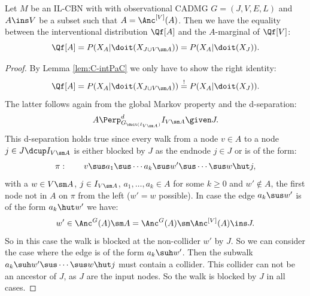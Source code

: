 \begin{Lem}
    \label{lem:int-anc}
    Let $M$ be an IL-CBN with with observational CADMG $G=(J,V,E,L)$ and $A \ins V$ be a subset such that 
    $A=\Anc^{[V]}(A)$.
    Then we have the equality between the interventional distribution $\Qf[A]$ and the $A$-marginal of $\Qf[V]$:
            \[ \Qf[A] = P(X_A|\doit(X_{J \cup V \sm A})) = P(X_A|\doit(X_J)). \]
    \begin{proof}
        By Lemma \ref{lem:C-intPaC} we only have to show the right identity:
        \[ \Qf[A] = P(X_A|\doit(X_{J \cup V \sm A})) \stackrel{!}{=} P(X_A|\doit(X_J)). \]
       The latter follows again from the global Markov property and the d-separation:
       \[ A \Perp^d_{G_{\doit(I_{V \sm A})}} I_{V \sm A} \given J.  \]
       This d-separation holds true since every walk from a node $v \in A$ to a node $j \in J \dcup I_{V \sm A}$ is either blocked by $J$ as the endnode $j \in J$ or is of the form:
       \[\pi:\qquad v \sus a_1 \sus \cdots a_k \sus w' \sus \cdots \sus w \hut j,\]
       with a $ w \in V \sm A$, $j \in I_{V\sm A}$, $a_1,\dots, a_k \in A$ for some $k \ge 0$ and $w' \notin A$, the first node not in $A$ on $\pi$ from the left ($w'=w$ possible).
       In case the edge $a_k \sus w'$ is of the form $a_k \hut w'$ we have:
       \[w' \in \Anc^G(A) \sm A = \Anc^G(A) \sm \Anc^{[V]}(A)  \ins J.\] 
      So in this case the walk is blocked at the non-collider $w'$ by $J$. 
       So we can consider the case where the edge is of the form $a_k \suh w'$.
       Then the subwalk $a_k \suh w' \sus \cdots \sus w \hut j$ must contain a collider. This collider can not be an ancestor of $J$, as $J$ are the input nodes. So the walk is blocked by $J$ in all cases.
    \end{proof}
\end{Lem}

